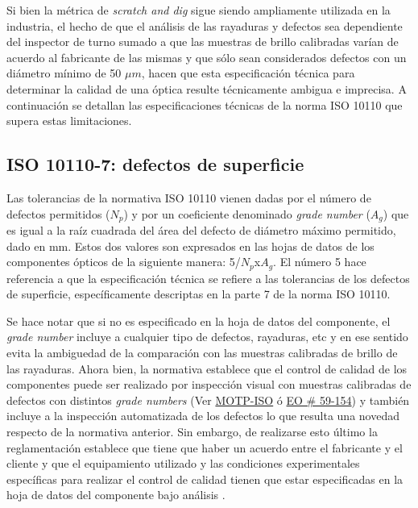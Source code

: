 Si bien la métrica de \textit{scratch and dig} sigue siendo ampliamente utilizada en la industria, el hecho de que el análisis de las rayaduras y defectos sea dependiente del inspector de turno sumado a que las muestras de brillo calibradas varían de acuerdo al fabricante de las mismas y que sólo sean considerados defectos con un diámetro mínimo de 50 $\mu m$, hacen que esta especificación técnica para determinar la calidad de una óptica resulte técnicamente ambigua e imprecisa.  A continuación se detallan las especificaciones técnicas de la norma ISO 10110 que supera estas limitaciones. %

\singlespacing
\subsection{ISO 10110-7: defectos de superficie}
\label{sec:iso10110}


\hspace{0.5cm}Las tolerancias de la normativa ISO 10110 vienen dadas por el número de defectos permitidos ($N_{p}$) y por un coeficiente denominado \textit{grade number} ($A_{g}$) que es igual a la raíz cuadrada del área del defecto de diámetro máximo permitido, dado en mm. Estos dos valores son expresados en las hojas de datos de los componentes ópticos de la siguiente manera: 5/$N_{p}$x$A_{g}$. El número 5 hace referencia a que la especificación técnica se refiere a las tolerancias de los defectos de superficie, específicamente descriptas en la parte 7 de la norma ISO 10110. 

Se hace notar que si no es especificado en la hoja de datos del componente, el \textit{grade number} incluye a cualquier tipo de defectos, rayaduras, etc y en ese sentido evita la ambiguedad de la comparación con las muestras calibradas de brillo de las rayaduras. Ahora bien, la normativa establece que el control de calidad de los componentes puede ser realizado por inspección visual con muestras calibradas de defectos con distintos \textit{grade numbers} (Ver \href{https://www.thorlabs.com/thorproduct.cfm?partnumber=MOTP-ISO}{MOTP-ISO} ó \href{https://www.edmundoptics.com/p/scratch-amp-dig-target-1st-surface-positive/15899/}{EO \# 59-154}) y también incluye a la inspección automatizada de los defectos lo que resulta una novedad respecto de la normativa anterior. Sin embargo, de realizarse esto último la reglamentación establece que tiene que haber un acuerdo entre el fabricante y el cliente y que el equipamiento utilizado y las condiciones experimentales específicas para realizar el control de calidad tienen que estar especificadas en la hoja de datos del componente bajo análisis \cite{acuerdocon}.

